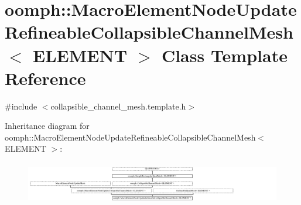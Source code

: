 \hypertarget{classoomph_1_1MacroElementNodeUpdateRefineableCollapsibleChannelMesh}{}\section{oomph\+:\+:Macro\+Element\+Node\+Update\+Refineable\+Collapsible\+Channel\+Mesh$<$ E\+L\+E\+M\+E\+NT $>$ Class Template Reference}
\label{classoomph_1_1MacroElementNodeUpdateRefineableCollapsibleChannelMesh}


{\ttfamily \#include $<$collapsible\+\_\+channel\+\_\+mesh.\+template.\+h$>$}

Inheritance diagram for oomph\+:\+:Macro\+Element\+Node\+Update\+Refineable\+Collapsible\+Channel\+Mesh$<$ E\+L\+E\+M\+E\+NT $>$\+:\begin{figure}[H]
\begin{center}
\leavevmode
\includegraphics[height=1.885522cm]{classoomph_1_1MacroElementNodeUpdateRefineableCollapsibleChannelMesh}
\end{center}
\end{figure}
